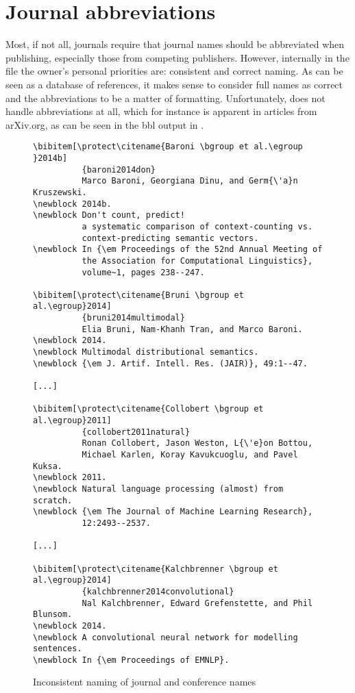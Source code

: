 \section{Journal abbreviations}
\label{sec:problems_abbreviations}

Most, if not all, journals require that journal names should be
abbreviated when publishing, especially those from competing
publishers.  However, internally in the {\bibtex} file the owner's
personal priorities are: consistent and correct naming.  As {\bibtex}
can be seen as a database of references, it makes sense to consider
full names as correct and the abbreviations to be a matter of
formatting.  Unfortunately, {\bibtex} does not handle abbreviations at
all, which for instance is apparent in articles from arXiv.org, as can
be seen in the bbl output in .

\begin{figure}
  \centering
\begin{small}
\begin{verbatim}
\bibitem[\protect\citename{Baroni \bgroup et al.\egroup }2014b]
          {baroni2014don}
          Marco Baroni, Georgiana Dinu, and Germ{\'a}n Kruszewski.
\newblock 2014b.
\newblock Don't count, predict!
          a systematic comparison of context-counting vs.
          context-predicting semantic vectors.
\newblock In {\em Proceedings of the 52nd Annual Meeting of
          the Association for Computational Linguistics},
          volume~1, pages 238--247.

\bibitem[\protect\citename{Bruni \bgroup et al.\egroup}2014]
          {bruni2014multimodal}
          Elia Bruni, Nam-Khanh Tran, and Marco Baroni.
\newblock 2014.
\newblock Multimodal distributional semantics.
\newblock {\em J. Artif. Intell. Res. (JAIR)}, 49:1--47.

[...]

\bibitem[\protect\citename{Collobert \bgroup et al.\egroup}2011]
          {collobert2011natural}
          Ronan Collobert, Jason Weston, L{\'e}on Bottou,
          Michael Karlen, Koray Kavukcuoglu, and Pavel Kuksa.
\newblock 2011.
\newblock Natural language processing (almost) from scratch.
\newblock {\em The Journal of Machine Learning Research},
          12:2493--2537.

[...]

\bibitem[\protect\citename{Kalchbrenner \bgroup et al.\egroup}2014]
          {kalchbrenner2014convolutional}
          Nal Kalchbrenner, Edward Grefenstette, and Phil Blunsom.
\newblock 2014.
\newblock A convolutional neural network for modelling sentences.
\newblock In {\em Proceedings of EMNLP}.
\end{verbatim}
\end{small}
  \caption{Inconsistent naming of journal and conference names}
\label{fig:inconsistent_naming}
\end{figure}

